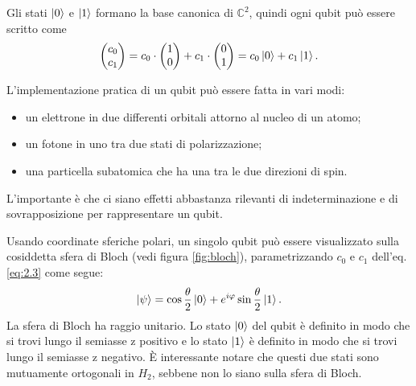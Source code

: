 Gli stati $\ket{0}$ e $\ket{1}$ formano la base canonica di $\mathbb{C}^2$, quindi 
ogni qubit può essere scritto come 
\begin{equation} \label{eq:2.3}
    \begin{pmatrix}
        c_0 \\ c_1
    \end{pmatrix}
    =
    c_0 \cdot 
    \begin{pmatrix}
        1 \\ 0
    \end{pmatrix}
    + c_1 \cdot 
    \begin{pmatrix}
        0 \\ 1
    \end{pmatrix}
    = c_0 \ket{0} + c_1 \ket{1}.
\end{equation}

L'implementazione pratica di un qubit può essere fatta in vari modi: 
\begin{itemize}
    \item un elettrone in due differenti orbitali attorno al nucleo di un atomo; 
    \item un fotone in uno tra due stati di polarizzazione; 
    \item una particella subatomica che ha una tra le due direzioni di spin. 
\end{itemize}
L'importante è che ci siano effetti abbastanza rilevanti di indeterminazione 
e di sovrapposizione per rappresentare un qubit. 

Usando coordinate sferiche polari, un singolo qubit può essere visualizzato sulla cosiddetta sfera 
di Bloch (vedi figura \ref{fig:bloch}), parametrizzando $c_0$ e $c_1$ dell'eq. \ref{eq:2.3} come segue: 
\begin{equation}
    \ket{\psi} = \cos\frac{\theta}{2}\ket{0} + e^{i\varphi}\sin\frac{\theta}{2}\ket{1}.
\end{equation}
La sfera di Bloch ha raggio unitario. 
Lo stato $\ket{0}$ del qubit è definito in modo che si trovi lungo il semiasse z positivo e lo 
stato $\ket{1}$ è definito in modo che si trovi lungo il semiasse z negativo.
È interessante notare che questi due stati sono mutuamente ortogonali in $H_2$, 
sebbene non lo siano sulla sfera di Bloch. 

